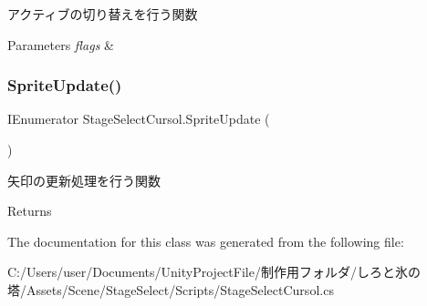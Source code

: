 アクティブの切り替えを行う関数 


\begin{DoxyParams}{Parameters}
{\em flags} & \\
\hline
\end{DoxyParams}
\mbox{\label{class_stage_select_cursol_a9879ca6a9ffa7ae70512430e12b1d305}} 
\subsubsection{\texorpdfstring{Sprite\+Update()}{SpriteUpdate()}}
{\footnotesize\ttfamily I\+Enumerator Stage\+Select\+Cursol.\+Sprite\+Update (\begin{DoxyParamCaption}{ }\end{DoxyParamCaption})\hspace{0.3cm}{\ttfamily [inline]}}



矢印の更新処理を行う関数 

\begin{DoxyReturn}{Returns}

\end{DoxyReturn}


The documentation for this class was generated from the following file\+:\begin{DoxyCompactItemize}
\item 
C\+:/\+Users/user/\+Documents/\+Unity\+Project\+File/制作用フォルダ/しろと氷の塔/\+Assets/\+Scene/\+Stage\+Select/\+Scripts/Stage\+Select\+Cursol.\+cs\end{DoxyCompactItemize}
